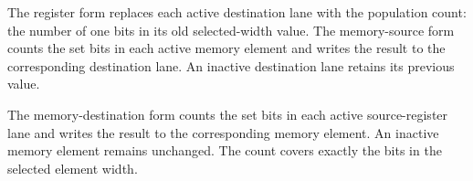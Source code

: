 The register form replaces each active destination lane with the population
count: the number of one bits in its old selected-width value. The memory-source
form counts the set bits in each active memory element and writes the result to
the corresponding destination lane. An inactive destination lane retains its
previous value.

The memory-destination form counts the set bits in each active source-register
lane and writes the result to the corresponding memory element. An inactive
memory element remains unchanged. The count covers exactly the bits in the
selected element width.
